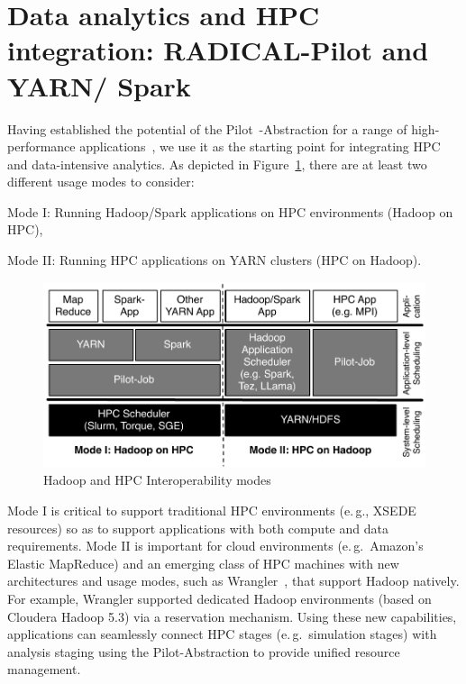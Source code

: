 \section{Data analytics and HPC integration: RADICAL-Pilot and YARN/ Spark}
\label{sec:integration_mode}
Having established the potential of the Pilot~-Abstraction for a range of high-performance applications~\cite{treikalis2016repex,ragothaman2014developing,ko2014numerical}, we use it as the starting point for integrating HPC and data-intensive analytics.
As depicted in Figure~\ref{fig:figures_hadoop-on-hpc-viceverse}, there are at least two different usage modes to consider:
\begin{inparaenum}[(i)]
    \item Mode I: Running Hadoop/Spark applications on HPC environments (Hadoop on HPC),
    \item Mode II: Running HPC applications on YARN clusters (HPC on Hadoop).
\end{inparaenum}

\begin{figure}[t]
    \centering
    \includegraphics[width=.85\textwidth]{figures/data_analytics_hpc/hpc_hadoop/hadoop-on-hpc-viceverse.pdf}
    \caption{Hadoop and HPC Interoperability modes\label{fig:figures_hadoop-on-hpc-viceverse}}
\end{figure}

Mode I is critical to support traditional HPC environments (e.\,g., XSEDE~\cite{xsede} resources) so as to support applications with both compute and data requirements.
Mode II is important for cloud environments (e.\,g.\ Amazon's Elastic MapReduce) and an emerging class of HPC machines with new architectures and usage modes, such as Wrangler~\cite{wrangler}, that support Hadoop natively.
For example, Wrangler supported dedicated Hadoop environments (based on Cloudera Hadoop 5.3) via a reservation mechanism.
Using these new capabilities, applications can seamlessly connect HPC stages (e.\,g.\ simulation stages) with analysis staging using the Pilot-Abstraction to provide unified resource management.

